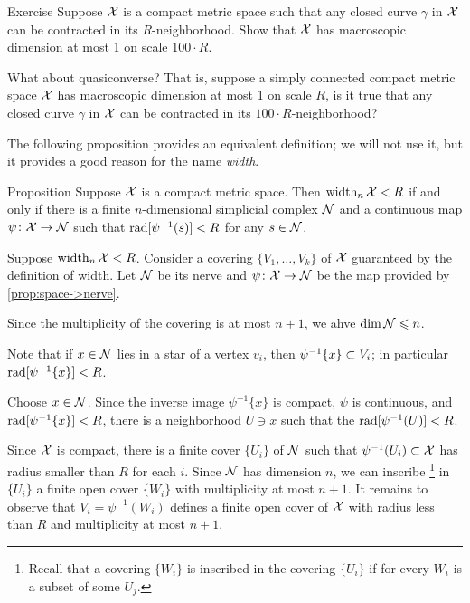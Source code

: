 \begin{thm}{Exercise}\label{ex:macrodimension}
Suppose $\mathcal{X}$ is a compact metric space such that any closed curve $\gamma$ in $\mathcal{X}$ can be contracted in its $R$-neighborhood.
Show that $\mathcal{X}$ has macroscopic dimension at most 1 on scale $100\cdot R$.

What about quasiconverse? That is, suppose a simply connected compact metric space $\mathcal{X}$ has macroscopic dimension at most 1 on scale $R$, is it true that any closed curve $\gamma$ in $\mathcal{X}$ can be contracted in its $100\cdot R$-neighborhood?
\end{thm}


The following proposition provides an equivalent definition;
we will not use it, but it provides a good reason for the name \emph{width}.

\begin{thm}{Proposition}\label{prop:width=suprad(inv)}
Suppose $\mathcal{X}$ is a compact metric space.
Then $\operatorname{\rm width}\nolimits_n\mathcal{X}<R$ if and only if there is a finite $n$-dimensional simplicial complex $\mathcal{N}$ and a continuous map $\psi\colon\mathcal{X}\to \mathcal{N}$
such that $\rad[\psi^{-1}(s)]\z<R$
for any $s\in \mathcal{N}$.
\end{thm}

Suppose $\operatorname{\rm width}\nolimits_n\mathcal{X}<R$.
Consider a covering $\{V_1,\dots,V_k\}$ of $\mathcal{X}$ guaranteed by the definition of width.
Let $\mathcal{N}$ be its nerve and $\psi\colon\mathcal{X}\to \mathcal{N}$ be the map provided by \ref{prop:space->nerve}.

Since the multiplicity of the covering is at most $n+1$, we ahve $\operatorname{\rm dim}\nolimits \mathcal{N}\leqslant n$.

Note that if $x\in \mathcal{N}$ lies in a star of a vertex $v_i$,
then $\psi^{-1}\{x\}\z\subset V_i$;
in particular $\mathop{\rm rad}\nolimits[\psi^{-1}\{x\}]<R$.

Choose $x\in \mathcal{N}$.
Since the inverse image $\psi^{-1}\{x\}$ is compact, $\psi$ is continuous, and $\mathop{\rm rad}\nolimits[\psi^{-1}\{x\}]<R$,
there is a neighborhood $U\ni x$ such that the  $\mathop{\rm rad}\nolimits[\psi^{-1}(U)]<R$.

Since $\mathcal{X}$ is compact,  there is a finite cover $\{U_i\}$ of $\mathcal{N}$ such that $\psi^{-1}(U_i)\subset\mathcal{X}$ has radius smaller than $R$ for each $i$.
Since $\mathcal{N}$ has dimension $n$, we can inscribe%
\footnote{Recall that a covering $\{W_i\}$ is inscribed in the covering $\{U_i\}$ if for every $W_i$ is a subset of some $U_j$.} 
in $\{U_i\}$ a finite open cover $\{W_i\}$ with multiplicity at most $n+1$.
It remains to observe that $V_i=\psi^{-1}(W_i)$ defines a finite open cover of $\mathcal{X}$ with radius less than $R$ and multiplicity at most $n+1$. 
\qeds

